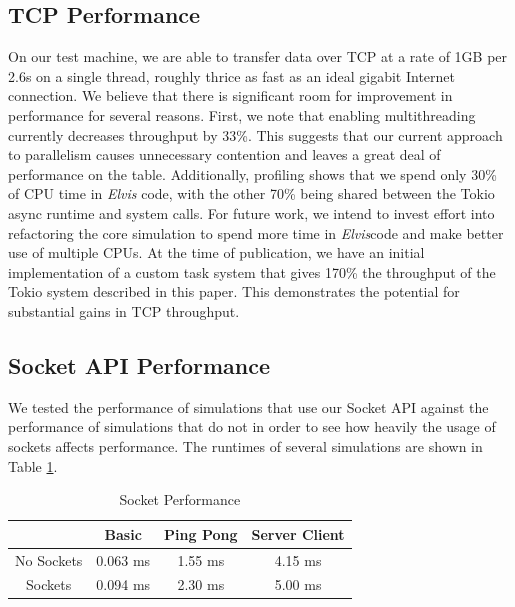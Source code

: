 \documentclass[journal]{IEEEtran} %
\newcommand{\elvis}{\textit{Elvis}}
\begin{document}
\subsection{TCP Performance}

On our test machine, we are able to transfer data over TCP at a rate of 1GB per 2.6s on a single thread, roughly thrice as fast as an ideal gigabit Internet connection. We believe that there is significant room for improvement in performance for several reasons. First, we note that enabling multithreading currently decreases throughput by 33\%. This suggests that our current approach to parallelism causes unnecessary contention and  leaves a great deal of performance on the table. Additionally, profiling shows that we spend only 30\% of CPU time in \elvis{} code, with the other 70\% being shared between the Tokio async runtime and system calls. For future work, we intend to invest effort into refactoring the core simulation to spend more time in \elvis code and make better use of multiple CPUs. At the time of publication, we have an initial implementation of a custom task system that gives 170\% the throughput of the Tokio system described in this paper. This demonstrates the potential for substantial gains in TCP throughput.

\subsection{Socket API Performance}
We tested the performance of simulations that use our  Socket API against the performance of simulations that do not in order to see how heavily the usage of sockets affects performance. The runtimes of several simulations are shown in Table \ref{tab:socket_perf}.

\begin{table}[H]
    \caption{Socket Performance}
    \begin{center}
        \begin{tabular}{|c|c|c|c|}
            \hline
            \textbf{} & \textbf{Basic} & \textbf{Ping Pong} & \textbf{Server Client} \\
            \hline
            No Sockets & 0.063 ms & 1.55 ms & 4.15 ms \\
            \hline
            Sockets & 0.094 ms & 2.30 ms & 5.00 ms \\
            \hline
        \end{tabular}
        \label{tab:socket_perf}
    \end{center}
\end{table}
\end{document}

